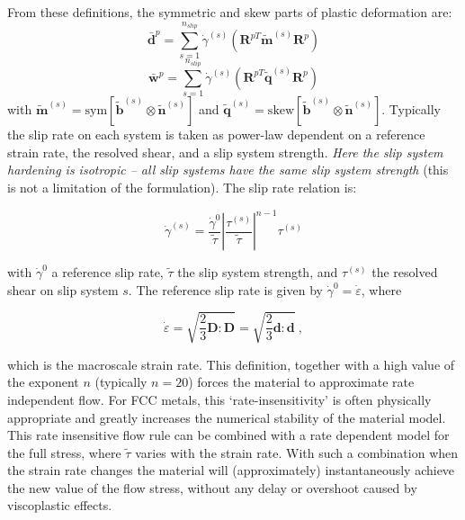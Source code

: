 \documentclass[11pt]{report}
\numberwithin{equation}{section}
\newcommand{\ti}{\emph}
\newcommand{\noi}{\noindent}
\begin{document}
From these definitions, the symmetric and skew parts of plastic deformation
are:
\[
\bar{\mathbf{d}}^{p}=
\sum_{s=1}^{n_{slip}}\dot{\gamma}^{\left(s\right)}
\left(\mathbf{R}^{pT}\tilde{\mathbf{m}}^{\left(s\right)}\mathbf{R}^{p}\right)
\]
\[
\bar{\mathbf{w}}^{p}=
\sum_{s=1}^{n_{slip}}\dot{\gamma}^{\left(s\right)}
\left(\mathbf{R}^{pT}\tilde{\mathbf{q}}^{\left(s\right)}\mathbf{R}^{p}\right)
\]
with $\tilde{\mathbf{m}}^{\left(s\right)}=
\mathrm{sym}\left[\tilde{\mathbf{b}}^{\left(s\right)}\otimes\tilde{\mathbf{n}}^{\left(s\right)}\right]$
and 
$\tilde{\mathbf{q}}^{\left(s\right)}=\mathrm{skew}\left[\tilde{\mathbf{b}}^
{\left(s\right)}\otimes\tilde{\mathbf{n}}^{\left(s\right)}\right]$.
Typically the slip rate on each system is taken as power-law dependent
on a reference strain rate, the resolved shear, and a slip system
strength. \ti{Here the slip system hardening is isotropic -- all slip
systems have the same slip system strength} (this is not a limitation
of the formulation).
The slip rate relation is:

\begin{equation}
\dot{\gamma}^{\left(s\right)}=
\frac{\dot{\gamma}^{0}}{\tilde{\tau}}
\left|\frac{\tau^{\left(s\right)}}{\tilde{\tau}}\right|^{n-1}\tau^{\left(s\right)}
\label{eq:gamma-dot}
\end{equation}

\noi with $\dot{\gamma}^{0}$ a reference slip rate, $\tilde{\tau}$ the
slip system strength, and $\tau^{\left(s\right)}$ the resolved shear
on slip system $s$. 
The reference slip rate is given by $\dot\gamma^0=\dot\varepsilon$, where

\begin{equation}
\dot\varepsilon=\sqrt{ \frac{2}{3}\mathbf{D}:\mathbf{D}}=\sqrt{\frac{2}{3}\mathbf{d}:\mathbf{d}}\ ,
\label{eq:dot-gamma-0}
\end{equation}



\noi which is the macroscale strain rate.  
	This definition, together with a high value of the exponent $n$ (typically
	$n=20$) forces the material to approximate rate independent flow.
	For FCC metals, this `rate-insensitivity' is often physically appropriate
	and greatly increases the numerical stability of the material model.
	This rate insensitive flow rule can be combined with a rate dependent
	model for the full stress, where $\tilde{\tau}$ varies with the strain rate.
	With such a combination when the strain rate changes the material will
	(approximately) instantaneously achieve the new value of the flow stress,
	without any delay or overshoot caused by viscoplastic effects.
\end{document}
